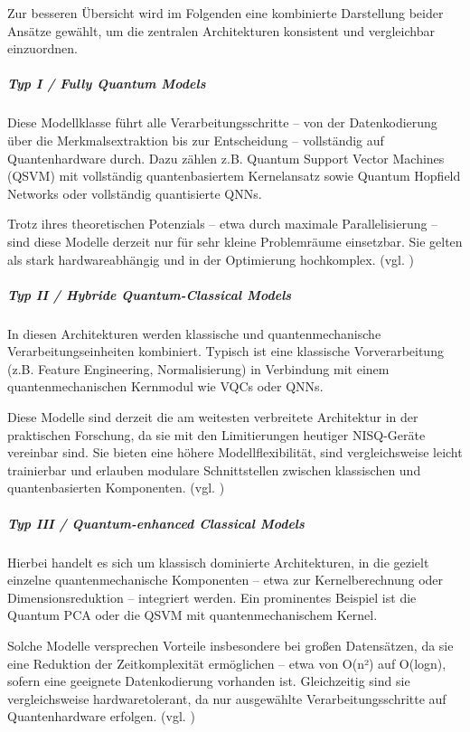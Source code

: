 Zur besseren Übersicht wird im Folgenden eine kombinierte Darstellung beider Ansätze gewählt, um die zentralen Architekturen konsistent und vergleichbar einzuordnen. 


\subparagraph{Typ I / Fully Quantum Models}
Diese Modellklasse führt alle Verarbeitungsschritte – von der Datenkodierung über die Merkmalsextraktion bis zur Entscheidung – vollständig auf Quantenhardware durch. Dazu zählen z.B. Quantum Support Vector Machines (QSVM) mit vollständig quantenbasiertem Kernelansatz sowie Quantum Hopfield Networks oder vollständig quantisierte QNNs. 

Trotz ihres theoretischen Potenzials – etwa durch maximale Parallelisierung – sind diese Modelle derzeit nur für sehr kleine Problemräume einsetzbar. Sie gelten als stark hardwareabhängig und in der Optimierung hochkomplex. (vgl. \cite{chengNoisyIntermediatescaleQuantum2023, mitarai_k_et_al_quantum_2018})


\subparagraph{Typ II / Hybride Quantum-Classical Models}
In diesen Architekturen werden klassische und quantenmechanische Verarbeitungseinheiten kombiniert. Typisch ist eine klassische Vorverarbeitung (z.B. Feature Engineering, Normalisierung) in Verbindung mit einem quantenmechanischen Kernmodul wie VQCs oder QNNs.

Diese Modelle sind derzeit die am weitesten verbreitete Architektur in der praktischen Forschung, da sie mit den Limitierungen heutiger NISQ-Geräte vereinbar sind. Sie bieten eine höhere Modellflexibilität, sind vergleichsweise leicht trainierbar und erlauben modulare Schnittstellen zwischen klassischen und quantenbasierten Komponenten. (vgl. \cite{mitarai_k_et_al_quantum_2018})


\subparagraph{ Typ III / Quantum-enhanced Classical Models}
Hierbei handelt es sich um klassisch dominierte Architekturen, in die gezielt einzelne quantenmechanische Komponenten – etwa zur Kernelberechnung oder Dimensionsreduktion – integriert werden. Ein prominentes Beispiel ist die Quantum PCA oder die QSVM mit quantenmechanischem Kernel.

Solche Modelle versprechen Vorteile insbesondere bei großen Datensätzen, da sie eine Reduktion der Zeitkomplexität ermöglichen – etwa von O(n²) auf O(logn), sofern eine geeignete Datenkodierung vorhanden ist. Gleichzeitig sind sie vergleichsweise hardwaretolerant, da nur ausgewählte Verarbeitungsschritte auf Quantenhardware erfolgen.
(vgl. \cite{chengNoisyIntermediatescaleQuantum2023})




